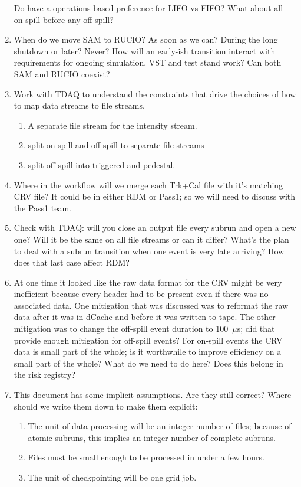 \begin{enumerate}
  Do have a operations based preference for LIFO vs FIFO? What about all on-spill before any off-spill?
\item   When do we move SAM to RUCIO? As soon as we can? During the long shutdown or later?  Never?
  How will an early-ish transition interact with requirements for ongoing simulation, VST and test stand work?
  Can both SAM and RUCIO coexist?
\item Work with TDAQ to understand the constraints that drive the choices of how to
  map data streams to file streams.
  \begin{enumerate}
    \item A separate file stream for the intensity stream.
    \item split on-spill and off-spill to separate file streams
    \item split off-spill into triggered and pedestal.
  \end{enumerate}
\item Where in the workflow will we merge each Trk+Cal file with it's matching CRV file?
  It could be in either RDM or Pass1; so we will need to discuss with the Pass1 team.
\item Check with TDAQ: will you close an output file every subrun and open a new one? Will it be the same
  on all file streams or can it differ?  What's the plan to deal with a subrun transition when one
  event is very late arriving?  How does that last case affect RDM?
\item At one time it looked like the raw data format for the CRV might be very inefficient
  because every header had to be present even if there was no associated data.
  One mitigation that was discussed was to reformat the raw data after it was in dCache and before it was written to tape.
  The other mitigation was to change the off-spill event duration to 100~$\mu$s; did that provide enough mitigation for off-spill events?
  For on-spill events the CRV data is small part of the whole; is it worthwhile to improve efficiency on a small part of the whole?
  What do we need to do here?  Does this belong in the risk registry?
\item This document has some implicit assumptions.  Are they still correct?  Where should we write them down to make them explicit:
  \begin{enumerate}
  \item The unit of data processing will be an integer number of files; because of atomic subruns, this implies an integer number
    of complete subruns.
  \item Files must be small enough to be processed in under a few hours.
  \item The unit of checkpointing will be one grid job.
  \end{enumerate}
\end{enumerate}


